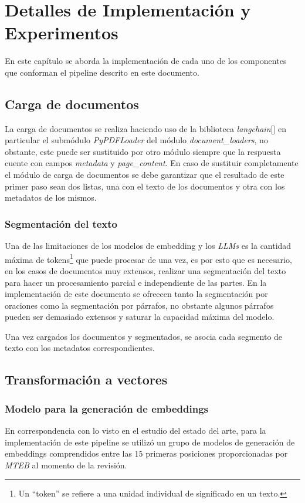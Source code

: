 \chapter{Detalles de Implementación y Experimentos}\label{chapter:implementation}
En este capítulo se aborda la implementación de cada uno de los componentes que conforman el pipeline
descrito en este documento.

\section{Carga de documentos}
La carga de documentos se realiza haciendo uso de la biblioteca \emph{langchain}[\cite{langchain}]
en particular el submódulo \emph{PyPDFLoader} del módulo \emph{document\_loaders}, no obstante, este puede ser sustituido por otro módulo siempre que la respuesta cuente con campos \emph{metadata} y \emph{page\_content}. En caso de sustituir completamente el módulo de carga de documentos se debe garantizar que el resultado de este primer paso sean dos listas, una con el texto de los documentos y otra con los metadatos de los mismos.
    \subsection{Segmentación del texto}
        Una de las limitaciones de los modelos de embedding y los \emph{LLMs} es la cantidad máxima de tokens\footnote{Un “token” se refiere a una unidad individual de significado en un texto.} que puede procesar de una vez, es por esto que es necesario, en los casos de documentos muy extensos, realizar una segmentación del texto para hacer un procesamiento parcial e independiente de las partes.
        En la implementación de este documento se ofreecen tanto la segmentación por oraciones como la segmentación por párrafos, no obstante algunos párrafos pueden ser demasiado extensos y saturar la capacidad máxima del modelo.

Una vez cargados los documentos y segmentados, se asocia cada segmento de texto con los metadatos correspondientes.

\section{Transformación a vectores}
    \subsection{Modelo para la generación de embeddings}
        En correspondencia con lo visto en el estudio del estado del arte, para la implementación de este pipeline se utilizó un grupo de modelos de generación de embeddings comprendidos entre las 15 primeras posiciones proporcionadas por \emph{MTEB}\cite{leaderboard} al momento de la revisión.

